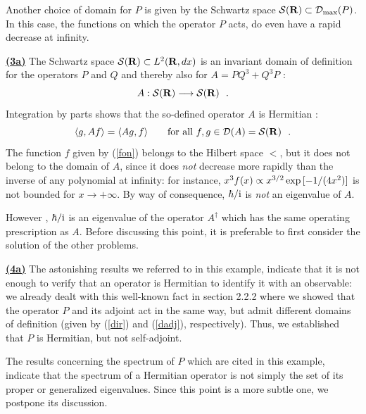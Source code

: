\documentclass[a4wide,12pt]{report}
\begin{document}
Another choice of domain for $P$ is given by the 
Schwartz space ${\cal S}({\bf R})
\subset {\cal D}_{{\rm max}} (P)$.
In this case, the functions on which the operator $P$ acts,  
 do even have a rapid decrease at infinity. 
 
\bigskip
 
\underline{{\bf (3a)}}
The Schwartz space ${\cal S}({\bf R}) \subset {L^2 ({{\bf R}},dx)}$ is an invariant  
domain of definition for the operators $P$ and $Q$ 
and thereby also for  
$A= PQ^3 +Q^3 P$ :
\[
A : {\cal S}({\bf R}) \longrightarrow {\cal S}({\bf R})
\ \ .
\]
Integration by parts shows that the so-defined operator 
$A$ is Hermitian :
\[
\langle g , A f \rangle  =
\langle A g , f \rangle
\qquad \mbox{for all} \ f,g \in {\cal D}(A) = {\cal S}({\bf R})
\ \ .
\]
The function $f$ given by (\ref{fon}) belongs to the Hilbert space 
$\lt$, but it does not belong to the domain 
of $A$, since it does {\em not} 
decrease more rapidly than the inverse 
of any polynomial at infinity: for instance, 
$x^3 f(x) \propto  x^{3/2} \, {\rm exp}\, [-1 /(4x^2)]$ 
is not bounded for 
$x \to +\infty$.
 By way of consequence, 
$\hbar /{\rm i}$ is {\em not} an eigenvalue of $A$.
 
However \cite{blt}, 
$\hbar /{\rm i}$ is an eigenvalue of the operator  
$A^{\dag}$ which has the same operating prescription as $A$.  
Before discussing this point, it is preferable to first consider the
solution of the other problems.  
 
\bigskip
 
\underline{{\bf (4a)}}
The astonishing 
results we referred to in this example, 
indicate that it is not enough 
to verify that an operator is Hermitian to identify it with  
an observable: 
we already dealt with this well-known fact 
in section 2.2.2 where 
we showed that the operator $P$ 
and its adjoint act in the same way, but admit  
different domains of definition 
(given by (\ref{dir}) and (\ref{dadj}), respectively).
Thus, we established that $P$ 
is Hermitian, but not self-adjoint.
 
The results concerning the spectrum of $P$ 
which are cited in this example, indicate that 
the spectrum of a Hermitian operator is not simply the set 
of its proper or generalized 
eigenvalues.
Since this point is a more subtle one, we postpone 
its discussion. 


 
\bigskip
 
\end{document}
